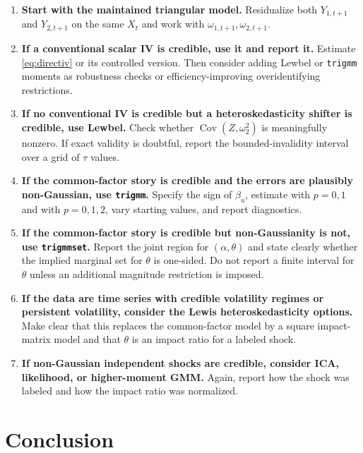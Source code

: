 \documentclass[11pt]{article}
\newcommand{\Cov}{\operatorname{Cov}}
\theoremstyle{plain}
\theoremstyle{definition}
\theoremstyle{remark}
\begin{document}
\begin{enumerate}
\item \textbf{Start with the maintained triangular model.} Residualize both
$Y_{1,t+1}$ and $Y_{2,t+1}$ on the same $X_t$ and work with
$\omega_{1,t+1},\omega_{2,t+1}$.

\item \textbf{If a conventional scalar IV is credible, use it and report it.}
Estimate \eqref{eq:directiv} or its controlled version. Then consider adding
Lewbel or \texttt{trigmm} moments as robustness checks or efficiency-improving
overidentifying restrictions.

\item \textbf{If no conventional IV is credible but a heteroskedasticity shifter is
credible, use Lewbel.} Check whether $\Cov(Z,\omega_2^2)$ is meaningfully nonzero. If
exact validity is doubtful, report the bounded-invalidity interval over a grid of
$\tau$ values.

\item \textbf{If the common-factor story is credible and the errors are plausibly
non-Gaussian, use \texttt{trigmm}.} Specify the sign of $\beta_u$, estimate with
$p=0,1$ and with $p=0,1,2$, vary starting values, and report diagnostics.

\item \textbf{If the common-factor story is credible but non-Gaussianity is not,
use \texttt{trigmmset}.} Report the joint region for $(\alpha,\theta)$ and state
clearly whether the implied marginal set for $\theta$ is one-sided. Do not report
a finite interval for $\theta$ unless an additional magnitude restriction is
imposed.

\item \textbf{If the data are time series with credible volatility regimes or
persistent volatility, consider the Lewis heteroskedasticity options.} Make clear
that this replaces the common-factor model by a square impact-matrix model and
that $\theta$ is an impact ratio for a labeled shock.

\item \textbf{If non-Gaussian independent shocks are credible, consider ICA,
likelihood, or higher-moment GMM.} Again, report how the shock was labeled and
how the impact ratio was normalized.
\end{enumerate}

\section{Conclusion}
\label{sec:conclusion}
\end{document}

